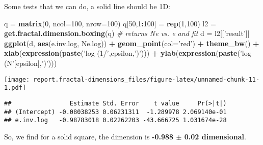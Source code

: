 \documentclass[]{article}
\newenvironment{Shaded}{\begin{snugshade}}{\end{snugshade}}
\newcommand{\CommentTok}[1]{\textcolor[rgb]{0.56,0.35,0.01}{\textit{#1}}}
\newcommand{\DataTypeTok}[1]{\textcolor[rgb]{0.13,0.29,0.53}{#1}}
\newcommand{\DecValTok}[1]{\textcolor[rgb]{0.00,0.00,0.81}{#1}}
\newcommand{\KeywordTok}[1]{\textcolor[rgb]{0.13,0.29,0.53}{\textbf{#1}}}
\newcommand{\NormalTok}[1]{#1}
\newcommand{\OperatorTok}[1]{\textcolor[rgb]{0.81,0.36,0.00}{\textbf{#1}}}
\newcommand{\StringTok}[1]{\textcolor[rgb]{0.31,0.60,0.02}{#1}}
\begin{document}
Some tests that we can do, a solid line should be 1D:

\begin{Shaded}
\begin{Highlighting}[]
\NormalTok{q =}\StringTok{ }\KeywordTok{matrix}\NormalTok{(}\DecValTok{0}\NormalTok{, }\DataTypeTok{ncol=}\DecValTok{100}\NormalTok{, }\DataTypeTok{nrow=}\DecValTok{100}\NormalTok{)}
\NormalTok{q[}\DecValTok{50}\NormalTok{,}\DecValTok{1}\OperatorTok{:}\DecValTok{100}\NormalTok{] =}\StringTok{ }\KeywordTok{rep}\NormalTok{(}\DecValTok{1}\NormalTok{,}\DecValTok{100}\NormalTok{)}
\NormalTok{l2 =}\StringTok{ }\KeywordTok{get.fractal.dimension.boxing}\NormalTok{(q)}
\CommentTok{# returns Ne vs. e and fit}
\NormalTok{d =}\StringTok{ }\NormalTok{l2[[}\StringTok{'result'}\NormalTok{]]}
\KeywordTok{ggplot}\NormalTok{(d, }\KeywordTok{aes}\NormalTok{(e.inv.log, Ne.log)) }\OperatorTok{+}\StringTok{ }\KeywordTok{geom_point}\NormalTok{(}\DataTypeTok{col=}\StringTok{'red'}\NormalTok{) }\OperatorTok{+}
\StringTok{  }\KeywordTok{theme_bw}\NormalTok{() }\OperatorTok{+}\StringTok{ }
\StringTok{  }\KeywordTok{xlab}\NormalTok{(}\KeywordTok{expression}\NormalTok{(}\KeywordTok{paste}\NormalTok{(}\StringTok{'log (1/'}\NormalTok{,epsilon,}\StringTok{')'}\NormalTok{))) }\OperatorTok{+}
\StringTok{  }\KeywordTok{ylab}\NormalTok{(}\KeywordTok{expression}\NormalTok{(}\KeywordTok{paste}\NormalTok{(}\StringTok{'log (N'}\NormalTok{[epsilon],}\StringTok{')'}\NormalTok{)))}
\end{Highlighting}
\end{Shaded}

\texttt{[image: report.fractal-dimensions\_files/figure-latex/unnamed-chunk-11-1.pdf]}

\begin{Shaded}
\end{Shaded}

\begin{verbatim}
##                Estimate Std. Error    t value     Pr(>|t|)
## (Intercept) -0.08038253 0.06231311  -1.289978 2.069140e-01
## e.inv.log   -0.98783018 0.02262203 -43.666725 1.031674e-28
\end{verbatim}

So, we find for a solid square, the dimension is \textbf{-0.988 \(\pm\)
0.02 dimensional}.
\end{document}
